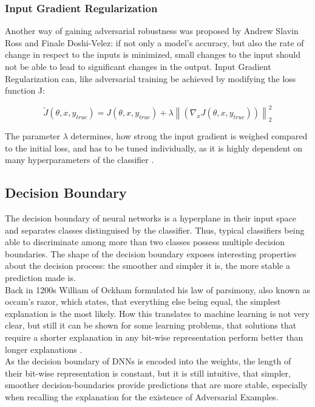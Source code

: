 \documentclass[draft,final]{vutinfth} %
\newcommand{\norm}[1]{\left\lVert#1\right\rVert}
\begin{document}
\subsubsection{Input Gradient Regularization}

Another way of gaining adversarial robustness was proposed by Andrew Slavin Ross and Finale Doshi-Velez: if not only a model's accuracy, but also the rate of change in respect to the inputs is minimized, small changes to the input should not be able to lead to significant changes in the output. 
Input Gradient Regularization can, like adversarial training be achieved by modifying the loss function J:

\begin{equation}
	\tilde{J}(\theta, x, y_{true}) = J(\theta, x, y_{true}) + \lambda \norm{(\nabla_x J(\theta, x, y_{true}))}_2^2
\end{equation}

The parameter $\lambda$ determines, how strong the input gradient is weighed compared to the initial loss, and has to be tuned individually, as it is highly dependent on many hyperparameters of the classifier \cite{Ross2017}.

\subsection{Decision Boundary}

The decision boundary of neural networks is a hyperplane in their input space and separates classes distinguised by the classifier.
Thus, typical classifiers being able to discriminate among more than two classes possess multiple decision boundaries.
The shape of the decision boundary exposes interesting properties about the decision process: the smoother and simpler it is, the more stable a prediction made is.\\
Back in 1200s William of Ockham formulated his law of parsimony, also known as occam’s razor, which states, that everything else being equal, the simplest explanation is the most likely. 
How this translates to machine learning is not very clear, but still it can be shown for some learning problems, that solutions that require a shorter explanation in any bit-wise representation perform better than longer explanations \cite{Blumer1987}.\\
As the decision boundary of DNNs is encoded into the weights, the length of their bit-wise representation is constant, but it is still intuitive, that simpler, smoother decision-boundaries provide predictions that are more stable, especially when recalling the explanation for the existence of Adversarial Examples.
\end{document}
